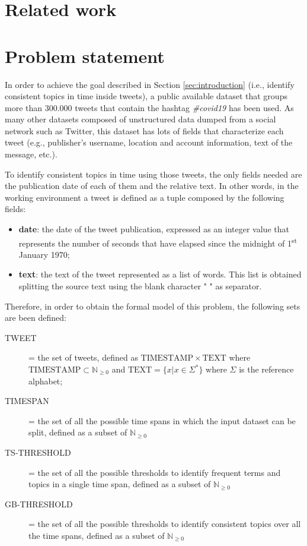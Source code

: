 \section{Related work}
\label{sec:related_word}


\section{Problem statement}
\label{sec:problem_statement}
In order to achieve the goal described in Section \ref{sec:introduction} (i.e., identify consistent topics in time inside tweets), a public available dataset that groups more than 300.000 tweets that contain the hashtag \textit{\#covid19} \cite{covid19-tweets-dataset} has been used. As many other datasets composed of unstructured data dumped from a social network such as Twitter, this dataset has lots of fields that characterize each tweet (e.g., publisher's username, location and account information, text of the message, etc.). 

To identify consistent topics in time using those tweets, the only fields needed are the publication date of each of them and the relative text. In other words, in the working environment a tweet is defined as a tuple composed by the following fields:
\begin{itemize}
	\item \textbf{date}: the date of the tweet publication, expressed as an integer value that represents the number of seconds that have elapsed since the midnight of 1\textsuperscript{st} January 1970;
	\item \textbf{text}: the text of the tweet represented as a list of words. This list is obtained splitting the source text using the blank character " " as separator.
\end{itemize}

Therefore, in order to obtain the formal model of this problem, the following sets are been defined:
\begin{description}
	\item[TWEET] = the set of tweets, defined as $\mathrm{TIMESTAMP} \times \mathrm{TEXT}$ where $\mathrm{TIMESTAMP} \subset \mathbb{N}_{\geq 0}$ and $\mathrm{TEXT} = \{x | x \in \Sigma^*\}$ where $\Sigma$ is the reference alphabet;
	\item[TIMESPAN] = the set of all the possible time spans in which the input dataset can be split, defined as a subset of $\mathbb{N}_{\geq 0}$
	\item[TS-THRESHOLD] = the set of all the possible thresholds to identify frequent terms and topics in a single time span, defined as a subset of $\mathbb{N}_{\geq 0}$
	\item[GB-THRESHOLD] = the set of all the possible thresholds to identify consistent topics over all the time spans, defined as a subset of $\mathbb{N}_{\geq 0}$
\end{description}

